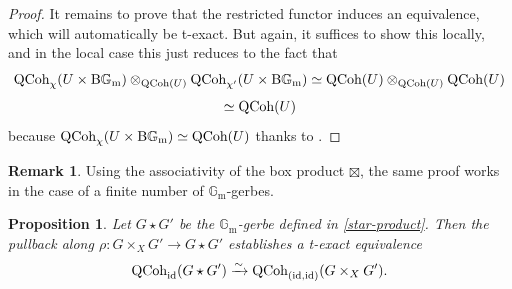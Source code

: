 \documentclass[11pt, twoside]{article} %
\numberwithin{equation}{section}
\theoremstyle{plain}
\newtheorem{prop}[thm]{Proposition}
\theoremstyle{definition}
\newtheorem{rem}[thm]{Remark}
\newcommand{\Gm}{\mathbb G_{\mathrm{m}}}
\newcommand{\id}{\textup{id}}
\newcommand{\QCoh}{\textup{QCoh}}
\newcommand{\BGm}{\textup{B}\Gm}
\begin{document}
\begin{proof}
		It remains to prove that the restricted functor induces an equivalence, which will automatically be t-exact. But again, it suffices to show this locally, and in the local case this just reduces to the fact that $$\QCoh_{\chi}(U\times\BGm)\otimes_{\QCoh(U)}\QCoh_{\chi'}(U\times \BGm)\simeq \QCoh(U)\otimes_{\QCoh(U)}\QCoh(U)$$$$\simeq \QCoh(U)$$ because $\QCoh_{\chi}(U\times\BGm)\simeq \QCoh(U)$ thanks to \cite[Lemma 5.20, (3)]{BP}.\end{proof}
		
	\begin{rem}
	Using the associativity of the box product $\boxtimes$, the same proof works in the case of a finite number of $\Gm$-gerbes.
	\end{rem}
	
	
	\begin{prop}\label{rigidification-pullback-theorem}Let $G\star G'$ be the $\Gm$-gerbe defined in \cref{star-product}. Then the pullback along $\rho:G\times_XG'\to G\star G'$ establishes a t-exact equivalence $$\QCoh_{\id}(G\star G')\xrightarrow{\sim}\QCoh_{(\id,\id)}(G\times_X G').$$
	\end{prop}
\end{document}
